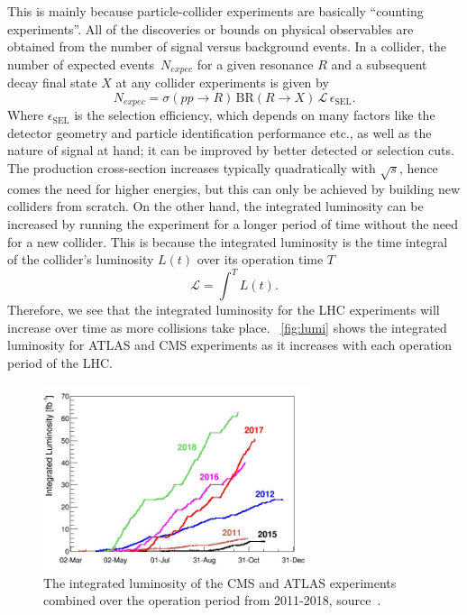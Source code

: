 This is mainly because particle-collider experiments are basically ``counting experiments''. All of the discoveries or bounds on physical observables are obtained from the number of signal versus background events.  In a collider, the number of expected events~$N_{expec}$ for a given resonance $R$ and a subsequent decay final state $X$ at any collider experiments is given by
\begin{equation}
	N_{expec} = \sigma(pp\to R) \, \mathrm{BR}(R \to X)\,\mathscr{L}  \, \epsilon_{\mathrm{SEL}}.
	\label{nevents}
\end{equation}
 Where $\epsilon_{\mathrm{SEL}}$ is the selection efficiency, which depends on many factors like the detector geometry and particle identification performance etc., as well as the nature of signal at hand; it can be improved by better detected or selection cuts. The production cross-section increases typically quadratically with $\sqrt {s}$, hence comes the need for higher energies, but this can only be achieved by building new colliders from scratch. On the other hand, the integrated luminosity can be increased by running the experiment for a longer period of time without the need for a new collider. This is because the integrated luminosity is the time integral of the collider's luminosity $L(t)$ over its operation time $T$
\begin{equation}
	\mathscr{L} = \int^{T} L(t) .
\end{equation}
Therefore, we see that the integrated luminosity for the LHC experiments will increase over time as more collisions take place. ~\autoref{fig:lumi} shows the integrated luminosity for ATLAS and CMS experiments as it increases with each operation period of the LHC. 
\begin{figure}[t!]
	\begin{center}
		\includegraphics[width=8cm]{figures/lhc_lumi}
		\caption{The integrated luminosity of the CMS and ATLAS experiments combined over the operation period from 2011-2018, source~\cite{lhcpreformance}.  \label{fig:lumi} }
	\end{center}
\end{figure}
